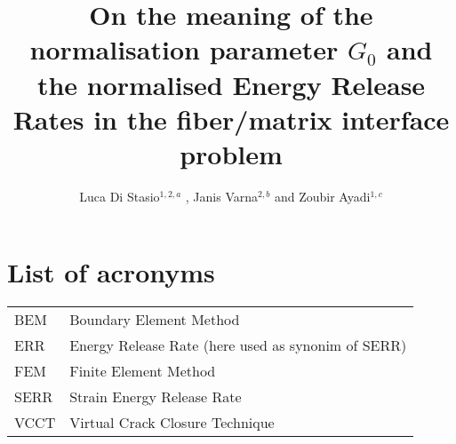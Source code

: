 \documentclass[a4paper]{jpconf}
\begin{document}

\title{On the meaning of the normalisation parameter $G_{0}$ and the normalised Energy Release Rates in the fiber/matrix interface problem}

\author{Luca Di Stasio$^{1,2,a}$ , Janis Varna$^{2,b}$ and Zoubir Ayadi$^{1,c}$ }

\address{$^{1}$SI2M, IJL, EEIGM, Universit\'e de Lorraine, 6 Rue Bastien Lepage, F-54010 Nancy, France\\$^{2}$Division of Polymer Engineering, Lule\aa\ University of Technology, SE-97187 Lule\aa , Sweden }

{\vspace*{5pt}\address{E-mail: $^{a}$luca.di-stasio@univ-lorraine.fr, $^{b}$janis.varna@ltu.se, $^{c}$zoubir.ayadi@univ-lorraine.fr}}


\begin{abstract}

\end{abstract}


\section*{List of acronyms}

\begin{tabular}{ll}
BEM &  Boundary Element Method\\
ERR &  Energy Release Rate (here used as synonim of SERR)\\
FEM &  Finite Element Method\\
SERR &  Strain Energy Release Rate\\
VCCT &  Virtual Crack Closure Technique\\
\end{tabular}
\end{document}
